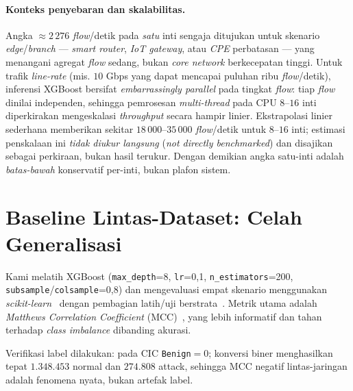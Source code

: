 \documentclass[11pt,a4paper]{article}
\begin{document}
\paragraph{Konteks penyebaran dan skalabilitas.} Angka $\approx 2\,276$
\emph{flow}/detik pada \emph{satu} inti sengaja ditujukan untuk skenario
\emph{edge}/\emph{branch} --- \emph{smart router}, \emph{IoT gateway}, atau
\emph{CPE} perbatasan --- yang menangani agregat \emph{flow} sedang, bukan
\emph{core network} berkecepatan tinggi. Untuk trafik \emph{line-rate}
(mis. $10$ Gbps yang dapat mencapai puluhan ribu \emph{flow}/detik), inferensi
XGBoost bersifat \emph{embarrassingly parallel} pada tingkat \emph{flow}: tiap
\emph{flow} dinilai independen, sehingga pemrosesan \emph{multi-thread} pada CPU
$8$--$16$ inti diperkirakan mengeskalasi \emph{throughput} secara hampir linier.
Ekstrapolasi linier sederhana memberikan sekitar $18\,000$--$35\,000$ \emph{flow}/detik
untuk $8$--$16$ inti; estimasi penskalaan ini \emph{tidak diukur langsung}
(\emph{not directly benchmarked}) dan disajikan sebagai perkiraan, bukan hasil terukur.
Dengan demikian angka satu-inti adalah \emph{batas-bawah} konservatif per-inti, bukan
plafon sistem.

\section{Baseline Lintas-Dataset: Celah Generalisasi}
\label{sec:baseline}

Kami melatih XGBoost (\texttt{max\_depth}=8, \texttt{lr}=0{,}1,
\texttt{n\_estimators}=200, \texttt{subsample}/\texttt{colsample}=0{,}8) dan
mengevaluasi empat skenario menggunakan \emph{scikit-learn}~\cite{sklearn} dengan
pembagian latih/uji berstrata~\cite{kohavi}. Metrik utama adalah \emph{Matthews
Correlation Coefficient} (MCC)~\cite{matthews,chicco}, yang lebih informatif dan
tahan terhadap \emph{class imbalance} dibanding akurasi.

Verifikasi label dilakukan: pada CIC \texttt{Benign}$=0$; konversi biner
menghasilkan tepat $1{.}348{.}453$ normal dan $274{.}808$ attack, sehingga MCC
negatif lintas-jaringan adalah fenomena nyata, bukan artefak label.
\end{document}
